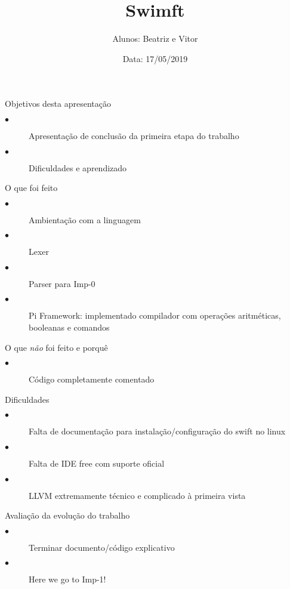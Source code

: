 \documentclass{beamer}
\title[Compiladores 2017.2]{Swimft}
\author[Abrev.]{Alunos: Beatriz e Vitor}
\institute[UFF]{Universidade Federal Fluminense}
\date{Data: 17/05/2019}
\begin{document}

\begin{frame}[plain]

\titlepage

\end{frame}


\begin{frame}{Objetivos desta apresentação}
\begin{description}
  \item[$\bullet$] Apresentação de conclusão da primeira etapa do trabalho
  \item[$\bullet$] Dificuldades e aprendizado
\end{description}
\end{frame}


\begin{frame}{O que foi feito}
\begin{description}
  \item[$\bullet$] Ambientação com a linguagem
  \item[$\bullet$] Lexer 
  \item[$\bullet$] Parser para Imp-0
  \item[$\bullet$] Pi Framework: implementado compilador com operações aritméticas, booleanas e comandos
\end{description}
\end{frame}


\begin{frame}{O que \emph{não} foi feito e porquê}
\begin{description}
  \item[$\bullet$] Código completamente comentado
\end{description}
\end{frame}


\begin{frame}{Dificuldades}
\begin{description}
  \item[$\bullet$] Falta de documentação para instalação/configuração do swift no linux
  \item[$\bullet$] Falta de IDE free com suporte oficial
  \item[$\bullet$] LLVM extremamente técnico e complicado à primeira vista
\end{description}
\end{frame}


\begin{frame}{Avaliação da evolução do trabalho}
\begin{description}
  \item[$\bullet$] Terminar documento/código explicativo
  \item[$\bullet$] Here we go to Imp-1!
\end{description}
\end{frame}
\end{document}
